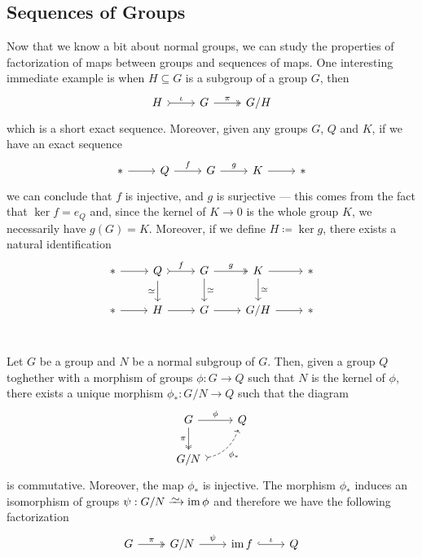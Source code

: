 \subsection{Sequences of Groups}

Now that we know a bit about normal groups, we can study the properties of
factorization of maps between groups and sequences of maps. One interesting
immediate example is when \(H \subseteq G\) is a subgroup of a group \(G\), then
\[
  \begin{tikzcd}
    H \ar[r, tail, "\iota"] &G \ar[r, two heads, "\pi"] &G/H
  \end{tikzcd}
\]
which is a short exact sequence. Moreover, given any groups \(G\), \(Q\) and
\(K\), if we have an exact sequence
\[
  \begin{tikzcd}
    * \ar[r] &Q \ar[r, "f"] &G \ar[r, "g"] &K \ar[r] &*
  \end{tikzcd}
\]
we can conclude that \(f\) is injective, and \(g\) is surjective --- this comes
from the fact that \(\ker f = e_Q\) and, since the kernel of \(K \to 0\) is the
whole group \(K\), we necessarily have \(g(G) = K\). Moreover, if we define \(H
\coloneq \ker g\), there exists a natural identification
\[
  \begin{tikzcd}
    * \ar[r]
    &Q \ar[d, swap, "\iso"] \ar[r, tail, "f"]
    &G \ar[r, two heads, "g"] \ar[d, "\iso"]
    &K \ar[r] \ar[d, "\iso"]
    &* \\
    * \ar[r] &H \ar[r] &G \ar[r] &G/H \ar[r] &* \\
  \end{tikzcd}
\]

\begin{proposition}
\label{prop:universal-property-quotients-grp}
Let \(G\) be a group and \(N\) be a normal subgroup of \(G\). Then, given a
group \(Q\) toghether with a morphism of groups \(\phi: G \to Q\) such that
\(N\) is the kernel of \(\phi\), there exists a unique morphism \(\phi_{*}: G/N
\to Q\) such that the diagram
\[
  \begin{tikzcd}
    G \ar[d, two heads, swap, "\pi"] \ar[r, "\phi"] &Q \\
    G/N \ar[ur, dashed, swap, bend right, tail, "\phi_{*}"] &
  \end{tikzcd}
\]
is commutative. Moreover, the map \(\phi_*\) is injective. The morphism
\(\phi_{*}\) induces an isomorphism of groups \(\psi: G/N \isoto \im \phi\) and
therefore we have the following factorization
\[
  \begin{tikzcd}
    G \ar[r, two heads, "\pi"] &G/N \ar[r, "\psi"]
    &\im f \ar[r, hook, "\iota"] &Q
  \end{tikzcd}
\]
\end{proposition}

